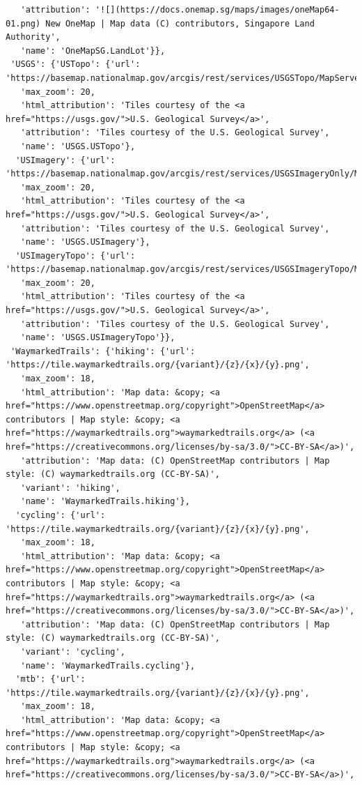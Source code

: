 \documentclass[
  letterpaper,
  DIV=11,
  numbers=noendperiod]{scrreprt}
\begin{document}
\begin{verbatim}
   'attribution': '![](https://docs.onemap.sg/maps/images/oneMap64-01.png) New OneMap | Map data (C) contributors, Singapore Land Authority',
   'name': 'OneMapSG.LandLot'}},
 'USGS': {'USTopo': {'url': 'https://basemap.nationalmap.gov/arcgis/rest/services/USGSTopo/MapServer/tile/{z}/{y}/{x}',
   'max_zoom': 20,
   'html_attribution': 'Tiles courtesy of the <a href="https://usgs.gov/">U.S. Geological Survey</a>',
   'attribution': 'Tiles courtesy of the U.S. Geological Survey',
   'name': 'USGS.USTopo'},
  'USImagery': {'url': 'https://basemap.nationalmap.gov/arcgis/rest/services/USGSImageryOnly/MapServer/tile/{z}/{y}/{x}',
   'max_zoom': 20,
   'html_attribution': 'Tiles courtesy of the <a href="https://usgs.gov/">U.S. Geological Survey</a>',
   'attribution': 'Tiles courtesy of the U.S. Geological Survey',
   'name': 'USGS.USImagery'},
  'USImageryTopo': {'url': 'https://basemap.nationalmap.gov/arcgis/rest/services/USGSImageryTopo/MapServer/tile/{z}/{y}/{x}',
   'max_zoom': 20,
   'html_attribution': 'Tiles courtesy of the <a href="https://usgs.gov/">U.S. Geological Survey</a>',
   'attribution': 'Tiles courtesy of the U.S. Geological Survey',
   'name': 'USGS.USImageryTopo'}},
 'WaymarkedTrails': {'hiking': {'url': 'https://tile.waymarkedtrails.org/{variant}/{z}/{x}/{y}.png',
   'max_zoom': 18,
   'html_attribution': 'Map data: &copy; <a href="https://www.openstreetmap.org/copyright">OpenStreetMap</a> contributors | Map style: &copy; <a href="https://waymarkedtrails.org">waymarkedtrails.org</a> (<a href="https://creativecommons.org/licenses/by-sa/3.0/">CC-BY-SA</a>)',
   'attribution': 'Map data: (C) OpenStreetMap contributors | Map style: (C) waymarkedtrails.org (CC-BY-SA)',
   'variant': 'hiking',
   'name': 'WaymarkedTrails.hiking'},
  'cycling': {'url': 'https://tile.waymarkedtrails.org/{variant}/{z}/{x}/{y}.png',
   'max_zoom': 18,
   'html_attribution': 'Map data: &copy; <a href="https://www.openstreetmap.org/copyright">OpenStreetMap</a> contributors | Map style: &copy; <a href="https://waymarkedtrails.org">waymarkedtrails.org</a> (<a href="https://creativecommons.org/licenses/by-sa/3.0/">CC-BY-SA</a>)',
   'attribution': 'Map data: (C) OpenStreetMap contributors | Map style: (C) waymarkedtrails.org (CC-BY-SA)',
   'variant': 'cycling',
   'name': 'WaymarkedTrails.cycling'},
  'mtb': {'url': 'https://tile.waymarkedtrails.org/{variant}/{z}/{x}/{y}.png',
   'max_zoom': 18,
   'html_attribution': 'Map data: &copy; <a href="https://www.openstreetmap.org/copyright">OpenStreetMap</a> contributors | Map style: &copy; <a href="https://waymarkedtrails.org">waymarkedtrails.org</a> (<a href="https://creativecommons.org/licenses/by-sa/3.0/">CC-BY-SA</a>)',

\end{verbatim}
\end{document}
